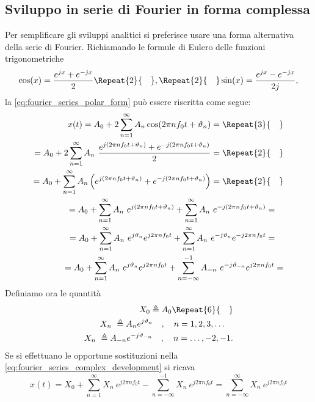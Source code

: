 \documentclass[12pt,oneside,openany]{memoir}
\numberwithin{equation}{subsection}
\newcommand{\quads}[1]{\Repeat{#1}{\quad}}
\begin{document}
\subsection{Sviluppo in serie di Fourier in forma complessa}
Per semplificare gli sviluppi analitici si preferisce usare una forma alternativa della serie di Fourier. Richiamando le formule di Eulero delle funzioni trigonometriche
\begin{equation}
	\cos(x) = \frac{e^{jx} + e^{-jx}}{2} \quads{2} , \quads{2} \sin(x) = \frac{e^{jx} - e^{-jx}}{2j},
\end{equation}
la \eqref{eq:fourier_series_polar_form} pu\`o essere riscritta come segue:
\begin{equation}\label{eq:fourier_series_complex_development}
\begin{split}
	x(t) = A_0 + 2 \sum_{n = 1}^{\infty} A_n \cos(2 \pi n f_0 t + \vartheta_n) =
	\quads{3}
	\\
	= A_0 + 2 \sum_{n = 1}^{\infty} A_n \ \frac{e^{j(2 \pi n f_0 t + \vartheta_n)} + e^{-j(2 \pi n f_0 t + \vartheta_n)}}{2} =
	\quads{2}
	\\
	= A_0 + \sum_{n = 1}^{\infty} A_n \left( e^{j(2 \pi n f_0 t + \vartheta_n)} + e^{-j(2 \pi n f_0 t + \vartheta_n)} \right) =
	\quads{2}
	\\
	= A_0 + \sum_{n = 1}^{\infty} A_n \ e^{j(2 \pi n f_0 t + \vartheta_n)} + \sum_{n = 1}^{\infty} A_n \ e^{-j(2 \pi n f_0 t + \vartheta_n)} =
	\quad
	\\
	= A_0 + \sum_{n = 1}^{\infty} A_n \ e^{j\vartheta_n}e^{j 2 \pi n f_0 t} + \sum_{n = 1}^{\infty} A_n \ e^{-j\vartheta_n}e^{-j 2 \pi n f_0 t} =
	\quad
	\\
	= A_0 + \sum_{n = 1}^{\infty} A_n \ e^{j\vartheta_n}e^{j 2 \pi n f_0 t} + \sum_{n = -\infty}^{-1} A_{-n} \ e^{-j\vartheta_{-n}}e^{j 2 \pi n f_0 t} =
\end{split}
\end{equation}
Definiamo ora le quantit\`a
\begin{equation}
\begin{split}
	X_0 \triangleq A_0
	\quads{6}
	\\
	X_n \ \triangleq A_n e^{j \vartheta_n} \quad , \quad n = 1, 2, 3, \dots
	\quad
	\\
	X_n \ \triangleq A_{-n} e^{-j \vartheta_{-n}} \quad , \quad n = \dots , -2, -1.
\end{split}
\end{equation}
Se si effettuano le opportune sostituzioni nella \eqref{eq:fourier_series_complex_development} si ricava
\begin{equation}\label{eq:fourier_series_complex_form}
	x(t) = X_0 + \sum_{n = 1}^{\infty} X_n \ e^{j 2 \pi n f_0 t} - \sum_{n = -\infty}^{-1} X_n \ e^{j 2 \pi n f_0 t} = \sum_{n = -\infty}^{\infty} X_n \ e^{j 2 \pi n f_0 t}
\end{equation}
\end{document}
